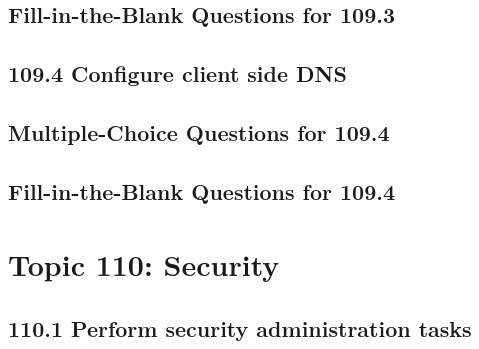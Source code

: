 \documentclass[a4paper]{report}
\begin{document}
\newpage
\section*{Fill-in-the-Blank Questions for 109.3}

\newpage
\section*{109.4 Configure client side DNS}

\newpage
\section*{Multiple-Choice Questions for 109.4}

\newpage
\section*{Fill-in-the-Blank Questions for 109.4}

\newpage
\chapter{Topic 110: Security}

\newpage
\section*{110.1 Perform security administration tasks}

\newpage
\end{document}
